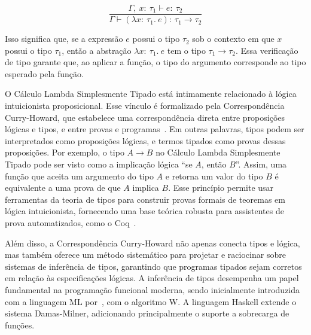 \[
  \frac{\Gamma,\ x{:}\ \tau_1 \vdash e{:}\ \tau_2}{\Gamma \vdash (\lambda x{:}\ \tau_1.\ e){:}\ \tau_1 \to \tau_2}
\]

Isso significa que, se a expressão $e$ possui o tipo $\tau_2$ sob o contexto em que $x$ possui o tipo $\tau_1$, então a abstração $\lambda x{:}\ \tau_1.\ e$ tem o tipo $\tau_1 \to \tau_2$.
Essa verificação de tipo garante que, ao aplicar a função, o tipo do argumento corresponde ao tipo esperado pela função.

O Cálculo Lambda Simplesmente Tipado está intimamente relacionado à lógica intuicionista proposicional.
Esse vínculo é formalizado pela Correspondência Curry-Howard, que estabelece uma correspondência direta entre proposições lógicas e tipos, e entre provas e programas~\cite{pierce2002types}.
Em outras palavras, tipos podem ser interpretados como proposições lógicas, e termos tipados como provas dessas proposições.
Por exemplo, o tipo $A \to B$ no Cálculo Lambda Simplesmente Tipado pode ser visto como a implicação lógica ``se $A$, então $B$''.
Assim, uma função que aceita um argumento do tipo $A$ e retorna um valor do tipo $B$ é equivalente a uma prova de que $A$ implica $B$.
Esse princípio permite usar ferramentas da teoria de tipos para construir provas formais de teoremas em lógica intuicionista, fornecendo uma base teórica robusta para assistentes de prova automatizados, como o Coq~\cite{coquand1988calculus}.

Além disso, a Correspondência Curry-Howard não apenas conecta tipos e lógica, mas também oferece um método sistemático para projetar e raciocinar sobre sistemas de inferência de tipos, garantindo que programas tipados sejam corretos em relação às especificações lógicas.
A inferência de tipos desempenha um papel fundamental na programação funcional moderna, sendo inicialmente introduzida com a linguagem ML por~, com o algoritmo W.
A linguagem Haskell extende o sistema Damas-Milner, adicionando principalmente o suporte a sobrecarga de funções.
